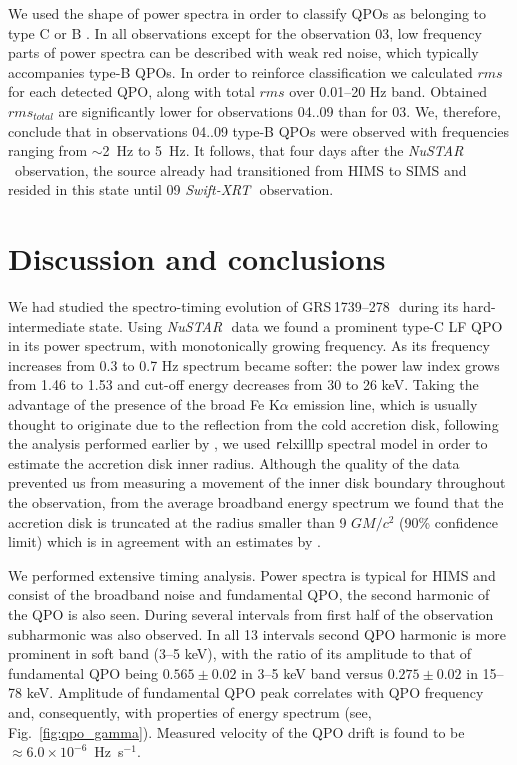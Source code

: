 \documentclass[a4paper,fleqn,usenatbib]{mnras}
\def\grs{{GRS\,1739--278\,}}
\def\swiftx{{\em Swift-XRT\,}}
\def\nustar{{\em NuSTAR\,}}
\begin{document}
We used the shape of power spectra in order to classify QPOs as belonging to type C or B \citep{casella05}. 
In all observations except for the observation 03, low frequency parts of power spectra can be described with weak red noise, which typically accompanies type-B QPOs.
In order to reinforce classification we calculated $rms$ for each detected QPO, along with total $rms$ over 0.01--20 Hz band. 
Obtained $rms_{total}$ are significantly lower for observations 04..09 than for 03. 
We, therefore, conclude that in observations 04..09 type-B QPOs were observed with frequencies ranging from $\sim$2~Hz to 5~Hz.
It follows, that four days after the \nustar\ observation, the source already had transitioned from HIMS to SIMS and resided in this state until 09 \swiftx\ observation. 



\section{Discussion and conclusions}
We had studied the spectro-timing evolution of \grs\, during its hard-intermediate state. Using \nustar\, data we found a prominent type-C LF QPO in its power spectrum, with monotonically growing frequency. As its frequency increases from 0.3 to 0.7 Hz spectrum became softer: the power law index grows from 1.46 to 1.53 and cut-off energy decreases from 30 to 26 keV. Taking the advantage of the presence of the broad Fe K$\alpha$ emission line, which is usually thought to originate due to the reflection from the cold accretion disk, following the analysis performed earlier by \citet{miller15_nust}, we used {\texttt relxilllp} spectral model in order to estimate the accretion disk inner radius. Although the quality of the data prevented us from measuring a movement of the inner disk boundary throughout the observation, from the average broadband energy spectrum we found that the accretion disk is truncated at the radius smaller than 9 $GM/c^{2}$ (90\% confidence limit) which is in agreement with an estimates by \citet{miller15_nust}. 

We performed extensive timing analysis.  Power spectra is typical for HIMS and consist of the broadband noise and fundamental QPO, the second harmonic of the QPO is also seen. 
During several intervals from first half of the observation subharmonic was also observed. 
In all 13 intervals second QPO harmonic is more prominent in soft band (3--5 keV), with the ratio of its amplitude to that of 
fundamental QPO being $0.565\pm0.02$ in 3--5 keV band versus $0.275\pm0.02$ in 15--78 keV. 
Amplitude of fundamental QPO peak correlates with QPO  frequency and, consequently, with properties of energy spectrum (see, Fig.~\ref{fig:qpo_gamma}).
Measured velocity of the QPO drift is found to be $\approx6.0\times10^{-6}$~Hz~s$^{-1}$.
\end{document}
